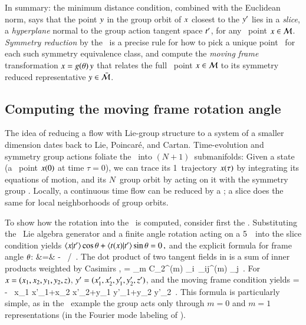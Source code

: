 \documentclass[preprint,12pt]{elsarticle} %
\begin{document}
In summary: the minimum distance condition, combined with the Euclidean
norm, says that the point $y$ in the group orbit of $x$ closest
to the {\template} ${y'}$ lies in a \emph{slice}, a {\em hyperplane}
normal to the group action tangent space $t'_{}$, for any \statesp\
point $x \in {\cal M}$. {\em Symmetry reduction} by the \mframes\ is a
precise rule for how to pick a unique point \sspRed\ for each such
symmetry equivalence class, and compute the \emph{moving frame}
transformation $x =g({\bf \theta})\, y$ that relates the full
\statesp\ point  $x \in {\cal M}$ to its symmetry reduced representative
$y \in \bar{\cal M}$.


\subsection{Computing the moving frame rotation angle}
\label{exam:CLErotAngle}

															\toCB
The idea of reducing a flow with Lie-group structure to a system of a
smaller dimension dates back to Lie, Poincar\'e, and Cartan.
Time-evolution and symmetry group actions foliate the \statesp\ into
$(N\!+\!1)$\dmn\ submanifolds: Given a state (a \statesp\ point $x(0)$
at time $\tau=0$), we can trace its  1\dmn\ trajectory $x(\tau)$ by
integrating its equations of motion, and its $N$\dmn\ group orbit by
acting on it with the symmetry group \Group. Locally, a continuous time
flow can be reduced by a \PoincSec; a slice does the same for local
neighborhoods of group orbits.

To show how the rotation into the \slice\ is computed, consider first the
\cLe. Substituting the \ Lie algebra
generator and a finite angle \SOn{2} rotation  acting on a
5\dmn\ \statesp\ into the slice condition \refeq{PCsectQ}
yields
\(\braket{\ssp}{\sliceTan{}}\cos\gSpace
    +\braket{\groupTan_{}(\ssp)}{\sliceTan{}} \sin\gSpace
= 0
\,,
\)
and the explicit formula for frame angle ${\bf \theta}$:
\bea
\tan\gSpace &=&
   - \, {\braket{\ssp}{\sliceTan{}}}/
          {\braket{\groupTan_{}(\ssp)}{\sliceTan{}}}
\,.
\label{SL:CLEsliceRot}
\eea
The dot product of two tangent fields in  is a
sum of inner products weighted by Casimirs \refeq{QuadCasimir},
\beq
\braket{\groupTan(\sspRed)}{\groupTan(\slicep)}
   = \sum_m C_2^{(m)} {\sspRed}_i\, \delta_{ij}^{(m)} \slicep_j
\,.
For \cLe\
$x = (x_1,x_2,y_1,y_2,z)$,
${y'} = (x_1',x_2',y_1',y_2',z')$,
and the moving frame condition  yields
\beq
\tan\gSpace =
- \, 
       {x_1 x'_1+x_2 x'_2+y_1 y'_1+y_2 y'_2}
\,.
This formula is particularly simple, as in the \cLe\
example the group acts only through $m=0$ and $m=1$ representations
(in the Fourier mode labeling of ).
\end{document}
